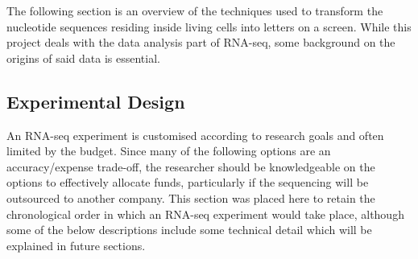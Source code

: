 The following section is an overview of the techniques used to transform the nucleotide sequences residing inside living cells into letters on a screen. While this project deals with the data analysis part of RNA-seq, some background on the origins of said data is essential. 


\subsection{Experimental Design}


An RNA-seq experiment is customised according to research goals and often limited by the budget. Since many of the following options are an accuracy/expense trade-off, the researcher should be knowledgeable on the options to effectively allocate funds, particularly if the sequencing will be outsourced to another company. This section was placed here to retain the chronological order in which an RNA-seq experiment would take place, although some of the below descriptions include some technical detail which will be explained in future sections.

